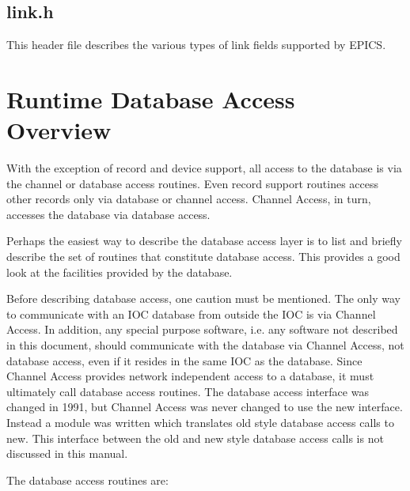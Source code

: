 \subsection{link.h }

This header file describes the various types of link fields supported by EPICS.

\section{Runtime Database Access Overview}

With the exception of record and device support, all access to the database is via the channel or database access routines.
Even record support routines access other records only via database or channel access.
Channel Access, in turn, accesses the database via database access.

Perhaps the easiest way to describe the database access layer is to list and briefly describe the set of routines that constitute database access.
This provides a good look at the facilities provided by the database.

Before describing database access, one caution must be mentioned.
The only way to communicate with an IOC database from outside the IOC is via Channel Access.
In addition, any special purpose software, i.e. any software not described in 
this document, should communicate with the database via Channel Access, not database access, even if it resides in the same IOC as the database.
Since Channel Access provides network independent access to a database, it must ultimately call database access routines.
The database access interface was changed in 1991, but Channel Access was never changed to use the new interface.
Instead a module was written which translates old style database access calls to new.
This interface between the old and new style database access calls is not discussed in this manual.

The database access routines are:

